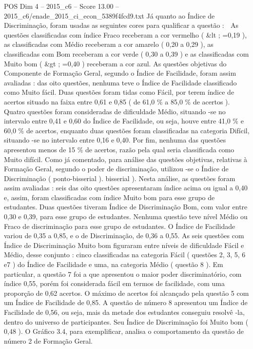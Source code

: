 \begin{textsample}{POS Dim 4 – 2015\_c6 – Score 13.00 – 2015\_c6/enade\_2015\_ci\_econ\_5389f4fcd9.txt}
Já quanto ao Índice de Discriminação, foram usadas as seguintes cores para qualificar a questão :  As questões classificadas com índice Fraco receberam a cor vermelho ( \&lt ; =0,19 ), as classificadas com Médio receberam a cor amarelo ( 0,20 a 0,29 ), as classificadas com Bom receberam a cor verde ( 0,30 a 0,39 ) e as classificadas com Muito bom ( \&gt ; =0,40 ) receberam a cor azul.
As questões objetivas do Componente de Formação Geral, segundo o Índice de Facilidade, foram assim avaliadas : das oito questões, nenhuma teve o Índice de Facilidade classificado como Muito fácil.
Duas questões foram tidas como Fácil, por terem índice de acertos situado na faixa entre 0,61 e 0,85 ( de 61,0 \% a 85,0 \% de acertos ).
Quatro questões foram consideradas de dificuldade Médio, situando -se no intervalo entre 0,41 e 0,60 do Índice de Facilidade, ou seja, houve entre 41,0 \% e 60,0 \% de acertos, enquanto duas questões foram classificadas na categoria Difícil, situando -se no intervalo entre 0,16 e 0,40.
Por fim, nenhuma das questões apresentou menos de 15 \% de acertos, razão pela qual seria classificada como Muito difícil.
Como já comentado, para análise das questões objetivas, relativas à Formação Geral, segundo o poder de discriminação, utilizou -se o Índice de Discriminação ( ponto-bisserial ). bisserial ).
Nesta análise, as questões foram assim avaliadas : seis das oito questões apresentaram índice acima ou igual a 0,40 e, assim, foram classificadas com índice Muito bom para esse grupo de estudantes.
Duas questões tiveram Índice de Discriminação Bom, com valor entre 0,30 e 0,39, para esse grupo de estudantes.
Nenhuma questão teve nível Médio ou Fraco de discriminação para esse grupo de estudantes.
O Índice de Facilidade variou de 0,35 a 0,85, e o de Discriminação, de 0,36 a 0,55.
As seis questões com Índice de Discriminação Muito bom figuraram entre níveis de dificuldade Fácil e Médio, desse conjunto : cinco classificadas na categoria Fácil ( questões 2, 3, 5, 6 e7 ) do Índice de Facilidade e uma, na categoria Médio ( questão 8 ).
Em particular, a questão 7 foi a que apresentou o maior poder discriminatório, com índice 0,55, porém foi considerada fácil em termos de facilidade, com uma proporção de 0,62 acertos.
O máximo de acertos foi alcançado pela questão 5 com um Índice de Facilidade de 0,85.
A questão de número 8 apresentou um Índice de Facilidade de 0,56, ou seja, mais da metade dos estudantes conseguiu resolvê -la, dentro do universo de participantes.
Seu Índice de Discriminação foi Muito bom ( 0,48 ).
O Gráfico 3.4, para exemplificar, analisa o comportamento da questão de número 2 de Formação Geral.

\end{textsample}

